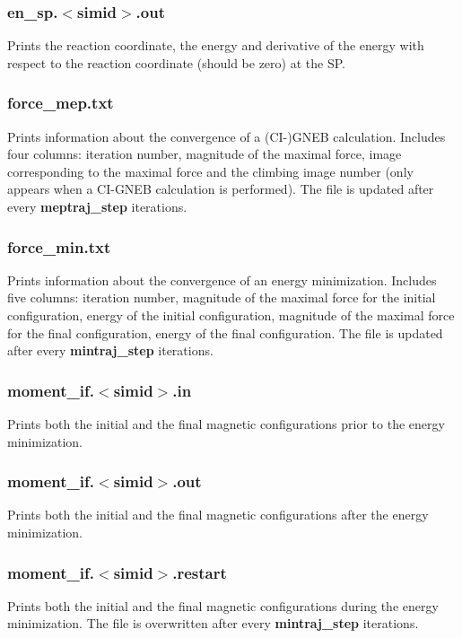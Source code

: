 \documentclass{article}
\begin{document}
\subsubsection*{en\_sp.$<$simid$>$.out}
Prints the reaction coordinate, the energy and derivative of the energy with respect to the reaction coordinate (should be zero) at the SP.

\subsubsection*{force\_mep.txt}
Prints information about the convergence of a (CI-)GNEB calculation. Includes four columns: iteration number, magnitude of the maximal force, image corresponding to the maximal force and the climbing image number (only appears when a CI-GNEB calculation is performed). The file is updated after every {\bf meptraj\_step} iterations.

\subsubsection*{force\_min.txt}
Prints information about the convergence of an energy minimization. Includes five columns: iteration number, magnitude of the maximal force for the initial configuration, energy of the initial configuration, magnitude of the maximal force for the final configuration, energy of the final configuration. The file is updated after every {\bf mintraj\_step} iterations.

\subsubsection*{moment\_if.$<$simid$>$.in}
Prints both the initial and the final magnetic configurations prior to the energy minimization. 

\subsubsection*{moment\_if.$<$simid$>$.out}
Prints both the initial and the final magnetic configurations after the energy minimization. 

\subsubsection*{moment\_if.$<$simid$>$.restart}
Prints both the initial and the final magnetic configurations during the energy minimization. The file is overwritten after every {\bf mintraj\_step} iterations. 
\end{document}
